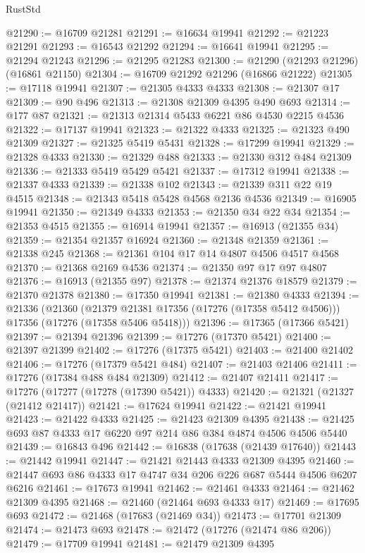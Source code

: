 \begin{lexlean}{RustStd}
\begin{coremodule}
@21290 := @16709 @21281
@21291 := @16634 @19941
@21292 := @21223 @21291
@21293 := @16543 @21292
@21294 := @16641 @19941
@21295 := @21294 @21243
@21296 := @21295 @21283
@21300 := @21290 (@21293 @21296) (@16861 @21150)
@21304 := @16709 @21292 @21296 (@16866 @21222)
@21305 := @17118 @19941
@21307 := @21305 @4333 @4333
@21308 := @21307 @17
@21309 := @90 @496
@21313 := @21308 @21309 @4395 @490 @693
@21314 := @177 @87
@21321 := @21313 @21314 @5433 @6221 @86 @4530 @2215 @4536
@21322 := @17137 @19941
@21323 := @21322 @4333
@21325 := @21323 @490 @21309
@21327 := @21325 @5419 @5431
@21328 := @17299 @19941
@21329 := @21328 @4333
@21330 := @21329 @488
@21333 := @21330 @312 @484 @21309
@21336 := @21333 @5419 @5429 @5421
@21337 := @17312 @19941
@21338 := @21337 @4333
@21339 := @21338 @102
@21343 := @21339 @311 @22 @19 @4515
@21348 := @21343 @5418 @5428 @4568 @2136 @4536
@21349 := @16905 @19941
@21350 := @21349 @4333
@21353 := @21350 @34 @22 @34
@21354 := @21353 @4515
@21355 := @16914 @19941
@21357 := @16913 (@21355 @34)
@21359 := @21354 @21357 @16924
@21360 := @21348 @21359
@21361 := @21338 @245
@21368 := @21361 @104 @17 @14 @4807 @4506 @4517 @4568
@21370 := @21368 @2169 @4536
@21374 := @21350 @97 @17 @97 @4807
@21376 := @16913 (@21355 @97)
@21378 := @21374 @21376 @18579
@21379 := @21370 @21378
@21380 := @17350 @19941
@21381 := @21380 @4333
@21394 := @21336
    (@21360
      (@21379 @21381 @17356 (@17276 (@17358 @5412 @4506)))
      @17356
      (@17276 (@17358 @5406 @5418)))
@21396 := @17365 (@17366 @5421)
@21397 := @21394 @21396
@21399 := @17276 (@17370 @5421)
@21400 := @21397 @21399
@21402 := @17276 (@17375 @5421)
@21403 := @21400 @21402
@21406 := @17276 (@17379 @5421 @484)
@21407 := @21403 @21406
@21411 := @17276 (@17384 @488 @484 @21309)
@21412 := @21407 @21411
@21417 := @17276 (@17277 (@17278 (@17390 @5421)) @4333)
@21420 := @21321 (@21327 (@21412 @21417))
@21421 := @17624 @19941
@21422 := @21421 @19941
@21423 := @21422 @4333
@21425 := @21423 @21309 @4395
@21438 := @21425 @693 @87 @4333 @17 @6220 @97 @214 @86 @384 @4874 @4506 @4506 @5440
@21439 := @16843 @496
@21442 := @16838 (@17638 (@21439 @17640))
@21443 := @21442 @19941
@21447 := @21421 @21443 @4333 @21309 @4395
@21460 := @21447 @693 @86 @4333 @17 @4747 @34 @206 @226 @687 @5444 @4506 @6207 @6216
@21461 := @17673 @19941
@21462 := @21461 @4333
@21464 := @21462 @21309 @4395
@21468 := @21460 (@21464 @693 @4333 @17)
@21469 := @17695 @693
@21472 := @21468 (@17683 (@21469 @34))
@21473 := @17701 @21309
@21474 := @21473 @693
@21478 := @21472 (@17276 (@21474 @86 @206))
@21479 := @17709 @19941
@21481 := @21479 @21309 @4395

\end{coremodule}
\end{lexlean}
